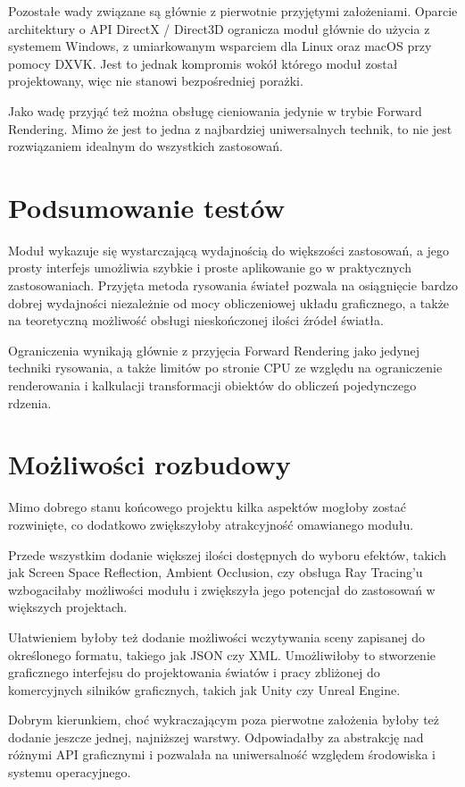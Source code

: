Pozostałe wady związane są głównie z pierwotnie przyjętymi założeniami. Oparcie architektury o API DirectX / Direct3D ogranicza moduł głównie do użycia z systemem Windows, z umiarkowanym wsparciem dla Linux oraz macOS przy pomocy DXVK. Jest to jednak kompromis wokół którego moduł został projektowany, więc nie stanowi bezpośredniej porażki. 

Jako wadę przyjąć też można obsługę cieniowania jedynie w trybie Forward Rendering. Mimo że jest to jedna z najbardziej uniwersalnych technik, to nie jest rozwiązaniem idealnym do wszystkich zastosowań.

\section{Podsumowanie testów}
Moduł wykazuje się wystarczającą wydajnością do większości zastosowań, a jego prosty interfejs umożliwia szybkie i proste aplikowanie go w praktycznych zastosowaniach. Przyjęta metoda rysowania świateł pozwala na osiągnięcie bardzo dobrej wydajności niezależnie od mocy obliczeniowej układu graficznego, a także na teoretyczną możliwość obsługi nieskończonej ilości źródeł światła.

Ograniczenia wynikają głównie z przyjęcia Forward Rendering jako jedynej techniki rysowania, a także limitów po stronie CPU ze względu na ograniczenie renderowania i kalkulacji transformacji obiektów do obliczeń pojedynczego rdzenia. 

\section{Możliwości rozbudowy}
Mimo dobrego stanu końcowego projektu kilka aspektów mogłoby zostać rozwinięte, co dodatkowo zwiększyłoby atrakcyjność omawianego modułu. 

Przede wszystkim dodanie większej ilości dostępnych do wyboru efektów, takich jak Screen Space Reflection, Ambient Occlusion, czy obsługa Ray Tracing'u wzbogaciłaby możliwości modułu i zwiększyła jego potencjał do zastosowań w większych projektach. 

Ułatwieniem byłoby też dodanie możliwości wczytywania sceny zapisanej do określonego formatu, takiego jak JSON czy XML. Umożliwiłoby to stworzenie graficznego interfejsu do projektowania światów i pracy zbliżonej do komercyjnych silników graficznych, takich jak Unity czy Unreal Engine.

Dobrym kierunkiem, choć wykraczającym poza pierwotne założenia byłoby też dodanie jeszcze jednej, najniższej warstwy. Odpowiadałby za abstrakcję nad różnymi API graficznymi i pozwalała na uniwersalność względem środowiska i systemu operacyjnego. 